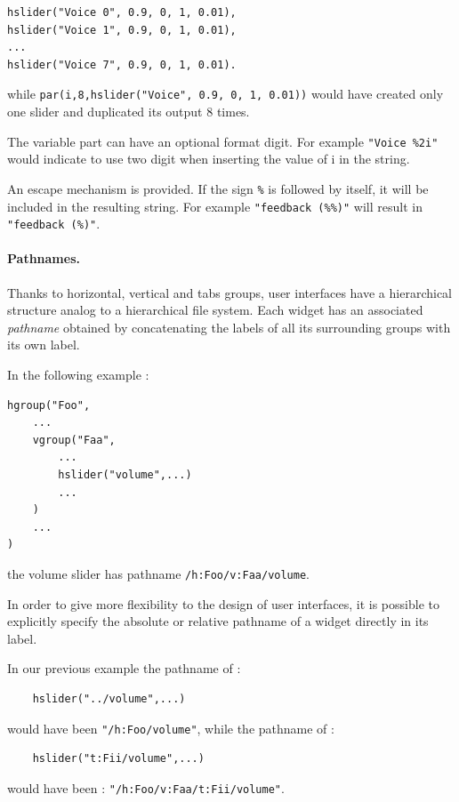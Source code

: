 \begin{lstlisting}
hslider("Voice 0", 0.9, 0, 1, 0.01),
hslider("Voice 1", 0.9, 0, 1, 0.01),
...
hslider("Voice 7", 0.9, 0, 1, 0.01).
\end{lstlisting}

while \lstinline'par(i,8,hslider("Voice", 0.9, 0, 1, 0.01))' would have created only one slider and duplicated its output 8 times.

The variable part can have an optional format digit. 
For example \lstinline'"Voice %2i"' would indicate to use two digit when inserting the value of i in the string.

An escape mechanism is provided.
If the sign \lstinline'%' is followed by itself, it will be included in the resulting string.
For example \lstinline'"feedback (%%)"' will result in \lstinline'"feedback (%)"'.

\paragraph{Pathnames.}
Thanks to horizontal, vertical and tabs groups, user interfaces have a hierarchical structure analog to a hierarchical file system. Each widget has an associated \textit{pathname} obtained by concatenating the labels of all its surrounding groups with its own label.

In the following example :
\begin{lstlisting}
hgroup("Foo",
	...
	vgroup("Faa", 
		...
		hslider("volume",...)
		...
	)
	...
)
\end{lstlisting}
the volume slider has pathname \lstinline'/h:Foo/v:Faa/volume'.

In order to give more flexibility to the design of user interfaces, it is possible to explicitly specify the absolute or relative pathname of a widget directly in its label. 

In our previous example the pathname of :
\begin{lstlisting}
	hslider("../volume",...)
\end{lstlisting}
would have been \lstinline'"/h:Foo/volume"', while the pathname of :
\begin{lstlisting}
	hslider("t:Fii/volume",...)
\end{lstlisting}
would have been : 
\lstinline'"/h:Foo/v:Faa/t:Fii/volume"'.

